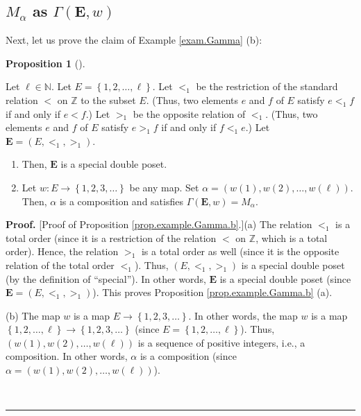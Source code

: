\documentclass[numbers=enddot,12pt,final,onecolumn,notitlepage,abstracton]{scrartcl}
\theoremstyle{definition}
\newtheorem{prop}[theo]{Proposition}
\newenvironment{proposition}[1][]
{\begin{prop}[#1]\begin{leftbar}}
{\end{leftbar}\end{prop}}
\newenvironment{proof}[1][Proof]{\noindent\textbf{#1.} }{\ \rule{0.5em}{0.5em}}
\newenvironment{verlong}{}{}
\begin{document}
\begin{verlong}
\begin{footnotesize}
\subsection{$M_{\alpha}$ as $\Gamma\left(  \mathbf{E},w\right)  $}

Next, let us prove the claim of Example \ref{exam.Gamma} (b):

\begin{proposition}
\label{prop.example.Gamma.b}Let $\ell\in\mathbb{N}$. Let $E=\left\{
1,2,\ldots,\ell\right\}  $. Let $<_{1}$ be the restriction of the standard
relation $<$ on $\mathbb{Z}$ to the subset $E$. (Thus, two elements $e$ and
$f$ of $E$ satisfy $e<_{1}f$ if and only if $e<f$.) Let $>_{1}$ be the
opposite relation of $<_{1}$. (Thus, two elements $e$ and $f$ of $E$ satisfy
$e>_{1}f$ if and only if $f<_{1}e$.) Let ${\mathbf{E}}=\left(  E,<_{1}%
,>_{1}\right)  $.

\begin{enumerate}
\item[(a)] Then, $\mathbf{E}$ is a special double poset.

\item[(b)] Let $w:E\rightarrow\left\{  1,2,3,\ldots\right\}  $ be any map. Set
$\alpha=\left(  w\left(  1\right)  ,w\left(  2\right)  ,\ldots,w\left(
\ell\right)  \right)  $. Then, $\alpha$ is a composition and satisfies
$\Gamma\left(  {\mathbf{E}},w\right)  =M_{\alpha}$.
\end{enumerate}
\end{proposition}

\begin{proof}
[Proof of Proposition \ref{prop.example.Gamma.b}.](a) The relation $<_{1}$ is
a total order (since it is a restriction of the relation $<$ on $\mathbb{Z}$,
which is a total order). Hence, the relation $>_{1}$ is a total order as well
(since it is the opposite relation of the total order $<_{1}$). Thus, $\left(
E,<_{1},>_{1}\right)  $ is a special double poset (by the definition of
\textquotedblleft special\textquotedblright). In other words, $\mathbf{E}$ is
a special double poset (since ${\mathbf{E}}=\left(  E,<_{1},>_{1}\right)  $).
This proves Proposition \ref{prop.example.Gamma.b} (a).

(b) The map $w$ is a map $E\rightarrow\left\{  1,2,3,\ldots\right\}  $. In
other words, the map $w$ is a map $\left\{  1,2,\ldots,\ell\right\}
\rightarrow\left\{  1,2,3,\ldots\right\}  $ (since $E=\left\{  1,2,\ldots
,\ell\right\}  $).
Thus, $\left(  w\left(  1\right)  ,w\left(  2\right)  ,\ldots,w\left(
\ell\right)  \right)  $ is a sequence of positive integers, i.e., a
composition. In other words, $\alpha$ is a composition (since $\alpha=\left(
w\left(  1\right)  ,w\left(  2\right)  ,\ldots,w\left(  \ell\right)  \right)
$).


\end{proof}
\end{footnotesize}
\end{verlong}
\end{document}
